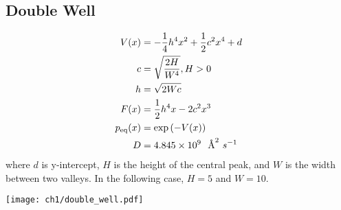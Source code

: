 \subsection{Double Well}
\begin{align}
        V(x) &= -\frac{1}{4} h^4 x^2 + \frac{1}{2} c^2 x^4 + d\\
        c    &= \sqrt{\frac{2H}{W^4}},H > 0 \\
        h    &= \sqrt{2Wc} \\
        F(x) &= \frac{1}{2} h^4 x - 2 c^2 x^3\\
        p_{\rm eq}(x) &= \exp{(-V(x))} \\
        D &= 4.845 \times 10^{9}~~\text{\AA}^2~s^{-1}\\
\end{align}
where $d$ is y-intercept, $H$ is the height of the central peak, and $W$ is the width between two valleys. In the following case, $H=5$ and $W=10$.
\begin{center}
        \texttt{[image: ch1/double\_well.pdf]} 
\end{center}